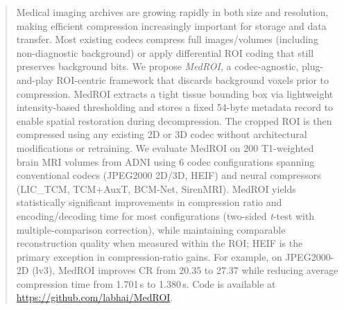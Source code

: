 \documentclass[runningheads]{llncs}
\begin{document}
\begin{abstract}
Medical imaging archives are growing rapidly in both size and resolution, making efficient compression increasingly important for storage and data transfer. Most existing codecs compress full images/volumes (including non-diagnostic background) or apply differential ROI coding that still preserves background bits. We propose \textit{MedROI}, a codec-agnostic, plug-and-play ROI-centric framework that discards background voxels prior to compression. MedROI extracts a tight tissue bounding box via lightweight intensity-based thresholding and stores a fixed 54-byte metadata record to enable spatial restoration during decompression. The cropped ROI is then compressed using any existing 2D or 3D codec without architectural modifications or retraining.
We evaluate MedROI on 200 T1-weighted brain MRI volumes from ADNI using 6 codec configurations spanning conventional codecs (JPEG2000 2D/3D, HEIF) and neural compressors (LIC\_TCM, TCM+AuxT, BCM-Net, SirenMRI). MedROI yields statistically significant improvements in compression ratio and encoding/decoding time for most configurations (two-sided \textit{t}-test with multiple-comparison correction), while maintaining comparable reconstruction quality when measured within the ROI; HEIF is the primary exception in compression-ratio gains. For example, on JPEG2000-2D (lv3), MedROI improves CR from 20.35 to 27.37 while reducing average compression time from 1.701\,s to 1.380\,s. Code is available at \url{https://github.com/labhai/MedROI}.

\end{abstract}
%
%
%
\end{document}
